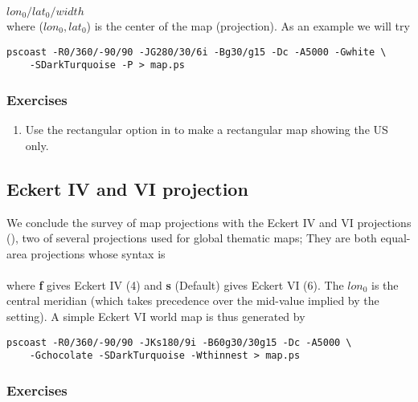 \documentclass[11pt]{report}
\begin{document}
$lon_0/lat_0/width$ \\

\noindent
where ($lon_0, lat_0$) is the center of the map (projection).
As an example we will try

{\small\begin{verbatim}
pscoast -R0/360/-90/90 -JG280/30/6i -Bg30/g15 -Dc -A5000 -Gwhite \
    -SDarkTurquoise -P > map.ps
\end{verbatim}
}

\subsubsection{Exercises}

\begin{enumerate}

\item Use the rectangular option in  to make a rectangular map
showing the US only.

\end{enumerate}

\subsection{Eckert IV and VI projection}

We conclude the survey of map projections with the Eckert IV and VI projections
(\Opt{JK}), two of several projections used for global thematic maps; They
are both equal-area projections whose syntax is \\

 \\

\noindent
where \textbf{f} gives Eckert IV (4) and \textbf{s} (Default) gives Eckert VI (6).
The $lon_0$ is the central meridian (which takes precedence over
the mid-value implied by the \Opt{R} setting).  A simple Eckert VI world map
is thus generated by

{\small\begin{verbatim}
pscoast -R0/360/-90/90 -JKs180/9i -B60g30/30g15 -Dc -A5000 \
    -Gchocolate -SDarkTurquoise -Wthinnest > map.ps
\end{verbatim}
}

\subsubsection{Exercises}
\end{document}
